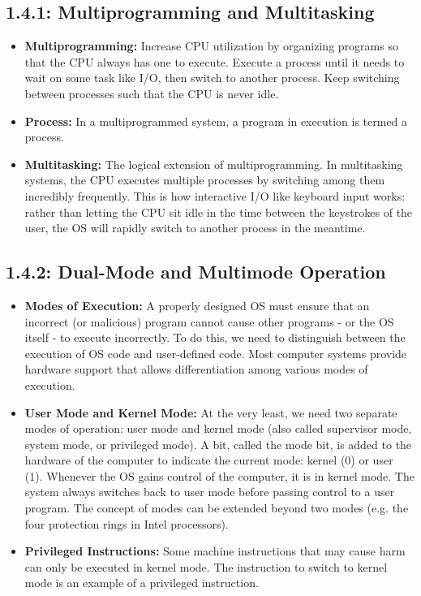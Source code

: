\documentclass[12pt]{article}
\begin{document}
\subsection*{1.4.1: Multiprogramming and Multitasking}

\begin{itemize}
    \item \textbf{Multiprogramming:} Increase CPU utilization by organizing programs so that the CPU always has one to execute. Execute a process until it needs to wait on some task like I/O, then switch to another process. Keep switching between processes such that the CPU is never idle.
    \item \textbf{Process:} In a multiprogrammed system, a program in execution is termed a process.
    \item \textbf{Multitasking:} The logical extension of multiprogramming. In multitasking systems, the CPU executes multiple processes by switching among them incredibly frequently. This is how interactive I/O like keyboard input works: rather than letting the CPU sit idle in the time between the keystrokes of the user, the OS will rapidly switch to another process in the meantime.
\end{itemize}

\subsection*{1.4.2: Dual-Mode and Multimode Operation}

\begin{itemize}
    \item \textbf{Modes of Execution:} A properly designed OS must ensure that an incorrect (or malicious) program cannot cause other programs - or the OS itself - to execute incorrectly. To do this, we need to distinguish between the execution of OS code and user-defined code. Most computer systems provide hardware support that allows differentiation among various modes of execution.
    \item \textbf{User Mode and Kernel Mode:} At the very least, we need two separate modes of operation: user mode and kernel mode (also called supervisor mode, system mode, or privileged mode). A bit, called the mode bit, is added to the hardware of the computer to indicate the current mode: kernel (0) or user (1). Whenever the OS gains control of the computer, it is in kernel mode. The system always switches back to user mode before passing control to a user program. The concept of modes can be extended beyond two modes (e.g. the four protection rings in Intel processors).
    \item \textbf{Privileged Instructions:} Some machine instructions that may cause harm can only be executed in kernel mode. The instruction to switch to kernel mode is an example of a privileged instruction.
\end{itemize}
\end{document}
